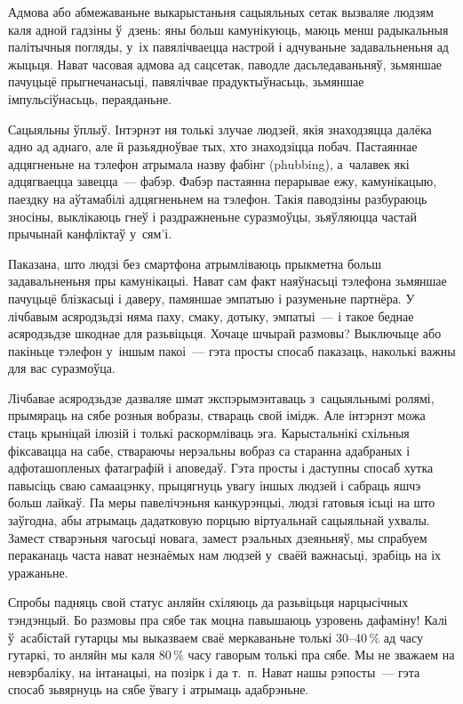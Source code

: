 Адмова або абмежаваньне выкарыстаньня сацыяльных сетак вызваляе людзям каля адной гадзіны ў~дзень: яны больш камунікуюць, маюць менш радыкальныя палітычныя погляды, у~іх павялічваецца настрой і адчуваньне задавальненьня ад жыцьця. Нават часовая адмова ад сацсетак, паводле дасьледаваньняў, зьмяншае пачуцьцё прыгнечанасьці, павялічвае прадуктыўнасьць, зьмяншае імпульсіўнасьць, пераяданьне.

Сацыяльны ўплыў. Інтэрнэт ня толькі злучае людзей, якія знаходзяцца далёка адно ад аднаго, але й разьядноўвае тых, хто знаходзіцца побач. Пастаяннае адцягненьне на тэлефон атрымала назву фабінг (phubbing), а~чалавек які адцягваецца завецца~--- фабэр. Фабэр пастаянна перарывае ежу, камунікацыю, паездку на аўтамабілі адцягненьнем на тэлефон. Такія паводзіны разбураюць зносіны, выклікаюць гнеў і раздражненьне суразмоўцы, зьяўляюцца частай прычынай канфліктаў у~сям'і.

Паказана, што людзі без смартфона атрымліваюць прыкметна больш задавальненьня пры камунікацыі. Нават сам факт наяўнасьці тэлефона зьмяншае пачуцьцё блізкасьці і даверу, памяншае эмпатыю і разуменьне партнёра. У лічбавым асяродзьдзі няма паху, смаку, дотыку, эмпатыі~--- і такое беднае асяродзьдзе шкоднае для разьвіцьця. Хочаце шчырай размовы? Выключыце або пакіньце тэлефон у~іншым пакоі~--- гэта просты спосаб паказаць, наколькі важны для вас суразмоўца.

Лічбавае асяродзьдзе дазваляе шмат экспэрымэнтаваць з~сацыяльнымі ролямі, прымяраць на сябе розныя вобразы, ствараць свой імідж. Але інтэрнэт можа стаць крыніцай ілюзій і толькі раскормліваць эга. Карыстальнікі схільныя фіксавацца на сабе, ствараючы нерэальны вобраз са старанна адабраных і адфоташопленых фатаграфій і аповедаў. Гэта просты і даступны спосаб хутка павысіць сваю самаацэнку, прыцягнуць увагу іншых людзей і сабраць яшчэ больш лайкаў. Па меры павелічэньня канкурэнцыі, людзі гатовыя ісьці на што заўгодна, абы атрымаць дадатковую порцыю віртуальнай сацыяльнай ухвалы. Замест стварэньня чагосьці новага, замест рэальных дзеяньняў, мы спрабуем пераканаць часта нават незнаёмых нам людзей у~сваёй важнасьці, зрабіць на іх уражаньне.

Спробы падняць свой статус анляйн схіляюць да разьвіцьця нарцысічных тэндэнцый. Бо размовы пра сябе так моцна павышаюць узровень дафаміну! Калі ў~асабістай гутарцы мы выказваем сваё меркаваньне толькі 30--40\,\% ад часу гутаркі, то анляйн мы каля 80\,\% часу гаворым толькі пра сябе. Мы не зважаем на невэрбаліку, на інтанацыі, на позірк і да т.~п. Нават нашы рэпосты~--- гэта спосаб зьвярнуць на сябе ўвагу і атрымаць адабрэньне.

